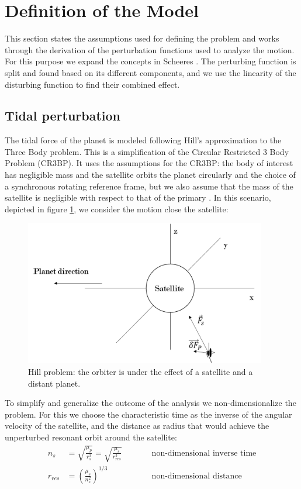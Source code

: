 \section{Definition of the Model}
This section states the assumptions used for defining the problem and works through the derivation of the perturbation functions used to analyze the motion. For this purpose we expand the concepts in Scheeres \cite{scheeres2012orbital}. The perturbing function is split and found based on its different components, and we use the linearity of the disturbing function to find their combined effect.

\subsection{Tidal perturbation}
The tidal force of the planet is modeled following Hill's approximation to the Three Body problem. This is a simplification of the Circular Restricted 3 Body Problem (CR3BP). It uses the assumptions for the CR3BP: the body of interest has negligible mass and the satellite orbits the planet circularly and the choice of a synchronous rotating reference frame, but we also assume that the mass of the satellite is negligible with respect to that of the primary \cite{nakazawa1988hill}. In this scenario, depicted in figure \ref{fig:vectorDiagram}, we consider the motion close the satellite:

\begin{figure}[h]
	\centering
	\includegraphics[height=2.5in]	
	{figures/1-vectorDiagram.png}
	\caption{Hill problem: the orbiter is under the effect of a satellite and a distant planet.}
	\label{fig:vectorDiagram}
\end{figure}

To simplify and generalize the outcome of the analysis we non-dimensionalize the problem. For this we choose the characteristic time as the inverse of the angular velocity of the satellite, and the distance as radius that would achieve the unperturbed resonant orbit around the satellite:
\begin{align}
n_s &= \sqrt{\frac{\mu_p}{r_s^3}} = \sqrt{\frac{\mu_s}{r_{res}^3}} \qquad && \text{non-dimensional inverse time} \\
r_{res} &= \left(\frac{\mu_s}{n_s^2}\right)^{1/3} && \text{non-dimensional distance} 
\end{align}

